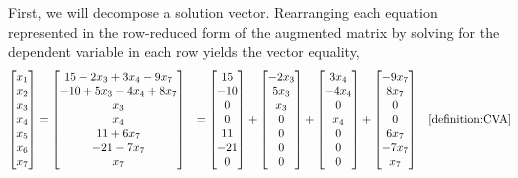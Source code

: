 \documentclass{ximera}
\begin{document}
\begin{example}
  First, we will decompose a solution vector.  Rearranging each
  equation represented in the row-reduced form of the augmented matrix
  by solving for the dependent variable in each row yields the vector
  equality,
  \begin{align*}
    \colvector{x_1\\x_2\\x_3\\x_4\\x_5\\x_6\\x_7}&=
                                                   \colvector{
                                                   15-2x_3+3x_4-9x_7\\
    -10+5x_3-4x_4+8x_7\\
    x_3\\
    x_4\\
    11+6x_7\\
    -21-7x_7\\
    x_7
    }
                                                 &=
                                                   \colvector{15\\ -10\\ 0\\ 0\\ 11\\ -21\\ 0 }
    +
    \colvector{ -2x_3\\ 5x_3\\ x_3\\ 0\\ 0\\ 0\\ 0 }
    +
    \colvector{ 3x_4\\ -4x_4\\ 0\\ x_4\\ 0\\ 0\\ 0 }
    +
    \colvector{ -9x_7\\ 8x_7\\ 0\\ 0\\ 6x_7\\ -7x_7\\ x_7 }
                                                 &&\ref{definition:CVA}\\

\end{align*}
\end{example}
\end{document}
